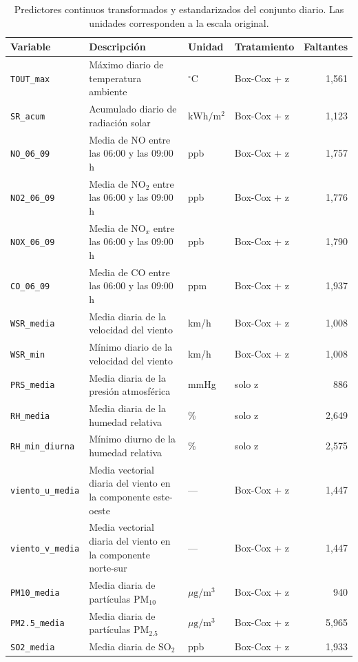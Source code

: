 \begin{table}[pos=t]
  \centering
  \caption{Predictores continuos transformados y estandarizados del conjunto
    diario. Las unidades corresponden a la escala original.}
  \label{tab:dic-diario-continuas}
  \footnotesize
  \setlength{\tabcolsep}{4pt}
  \begin{tabular}{lp{7.2cm}llr}
    \toprule
    Variable & Descripción & Unidad & Tratamiento & Faltantes \\
    \midrule
    \texttt{TOUT\_max} & Máximo diario de temperatura ambiente
      & $^{\circ}\mathrm{C}$ & Box-Cox + z & 1,561 \\
    \texttt{SR\_acum} & Acumulado diario de radiación solar
      & $\mathrm{kWh}/\mathrm{m}^{2}$ & Box-Cox + z & 1,123 \\
    \texttt{NO\_06\_09} & Media de NO entre las 06:00 y las 09:00 h
      & ppb & Box-Cox + z & 1,757 \\
    \texttt{NO2\_06\_09} & Media de NO$_2$ entre las 06:00 y las 09:00 h
      & ppb & Box-Cox + z & 1,776 \\
    \texttt{NOX\_06\_09} & Media de NO$_x$ entre las 06:00 y las 09:00 h
      & ppb & Box-Cox + z & 1,790 \\
    \texttt{CO\_06\_09} & Media de CO entre las 06:00 y las 09:00 h
      & ppm & Box-Cox + z & 1,937 \\
    \texttt{WSR\_media} & Media diaria de la velocidad del viento
      & km/h & Box-Cox + z & 1,008 \\
    \texttt{WSR\_min} & Mínimo diario de la velocidad del viento
      & km/h & Box-Cox + z & 1,008 \\
    \texttt{PRS\_media} & Media diaria de la presión atmosférica
      & mmHg & solo z & 886 \\
    \texttt{RH\_media} & Media diaria de la humedad relativa
      & \% & solo z & 2,649 \\
    \texttt{RH\_min\_diurna} & Mínimo diurno de la humedad relativa
      & \% & solo z & 2,575 \\
    \texttt{viento\_u\_media} & Media vectorial diaria del viento en la
      componente este-oeste & --- & Box-Cox + z & 1,447 \\
    \texttt{viento\_v\_media} & Media vectorial diaria del viento en la
      componente norte-sur & --- & Box-Cox + z & 1,447 \\
    \texttt{PM10\_media} & Media diaria de partículas PM$_{10}$
      & $\mu\mathrm{g}/\mathrm{m}^{3}$ & Box-Cox + z & 940 \\
    \texttt{PM2.5\_media} & Media diaria de partículas PM$_{2.5}$
      & $\mu\mathrm{g}/\mathrm{m}^{3}$ & Box-Cox + z & 5,965 \\
    \texttt{SO2\_media} & Media diaria de SO$_2$
      & ppb & Box-Cox + z & 1,933 \\
    \bottomrule
  \end{tabular}
\end{table}

